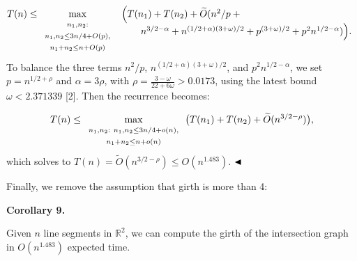 \documentclass[10pt,a4paper]{article}
\begin{document}
\par
\[\begin{aligned}
T(n)\leq\max_{\begin{array}[]{c}\scriptstyle{n_{1},n_{2}:}\\
\scriptstyle{n_{1},n_{2}\leq 3n/4+O(p),}\\
\scriptstyle{n_{1}+n_{2}\leq n+O(p)}\end{array}}\begin{array}[t]{l}\Big(T(n_{1%
})+T(n_{2})+\widetilde{O}(n^{2}/p+{}\\[2.15277pt]
\qquad n^{3/2-\alpha}+n^{(1/2+\alpha)(3+\omega)/2}+p^{(3+\omega)/2}+p^{2}n^{1/%
2-\alpha})\Big).\end{array}
\end{aligned}\]
To balance the three terms $n^{2}/p$, $n^{(1/2+\alpha)(3+\omega)/2}$, and $p^{2}n^{1/2-\alpha}$, we set $p=n^{1/2+\rho}$ and $\alpha=3\rho$, with $\rho=\frac{3-\omega}{22+6\omega}>0.0173$, using the latest bound $\omega<2.371339$ [2]. Then the recurrence becomes:
\par
\[\begin{aligned}
T(n)\leq\max_{\begin{array}[]{c}\scriptstyle{n_{1},n_{2}:\ n_{1},n_{2}\leq 3n/%
4+o(n),}\\
\scriptstyle{n_{1}+n_{2}\leq n+o(n)}\end{array}}\big(T(n_{1})+T(n_{2})+%
\widetilde{O}(n^{3/2-\rho})\big),
\end{aligned}\]
which solves to $T(n)=\widetilde{O}(n^{3/2-\rho})\leq O(n^{1.483})$. $\hfill\blacktriangleleft$
\par
\par
Finally, we remove the assumption that girth is more than 4:
\par
\par

\par\medskip\noindent\textbf{Corollary 9.}\par
Given $n$ line segments in $\mathbb{R}^{2}$, we can compute the girth of the intersection graph in $O(n^{1.483})$ expected time.
\par
\par
\par
\end{document}
